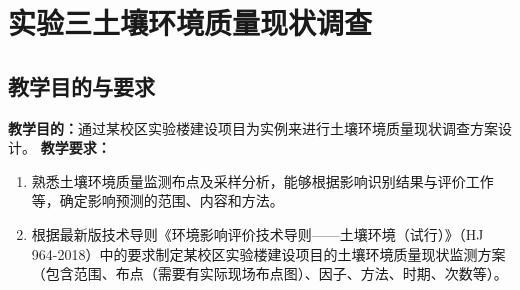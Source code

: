 \newpage\null\par
\section{实验三\hspace{1em}土壤环境质量现状调查}
\subsection{教学目的与要求}
\noindent\textbf{教学目的：}通过某校区实验楼建设项目为实例来进行土壤环境质量现状调查方案设计。
\newline\textbf{教学要求：} 
\begin{enumerate}
    \item 熟悉土壤环境质量监测布点及采样分析，能够根据影响识别结果与评价工作等，确定影响预测的范围、内容和方法。
    \item 根据最新版技术导则《环境影响评价技术导则——土壤环境（试行）》（HJ 964-2018）中的要求制定某校区实验楼建设项目的土壤环境质量现状监测方案（包含范围、布点（需要有实际现场布点图）、因子、方法、时期、次数等）。
\end{enumerate}


